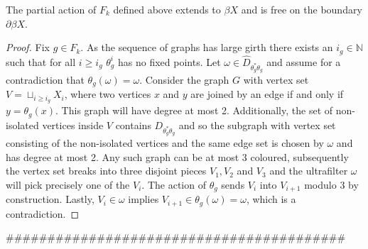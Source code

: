 \begin{lemma}\label{Lem:ParFree}
The partial action of $F_{k}$ defined above extends to $\beta X$ and is free on the boundary $\partial \beta X$.
\end{lemma}
\begin{proof}
Fix $g \in F_{k}$. As the sequence of graphs has large girth there exists an $i_{g} \in \mathbb{N}$ such that for all $i\geq i_{g}$ $\theta_{g}^{i}$ has no fixed points.  Let $\omega \in \widehat{D}_{\theta_{g}^{*}\theta_{g}}$ and assume for a contradiction that $\theta_{g}(\omega)=\omega$. Consider the graph $G$ with vertex set $V=\sqcup_{i\geq i_{g}} X_{i}$, where two vertices $x$ and $y$ are joined by an edge if and only if $y=\theta_{g}(x)$. This graph will have degree at most 2. Additionally, the set of non-isolated vertices inside $V$ contains $D_{\theta_{g}^{*}\theta_{g}}$ and so the subgraph with vertex set consisting of the non-isolated vertices and the same edge set is chosen by $\omega$ and has degree at most 2. Any such graph can be at most $3$ coloured, subsequently the vertex set breaks into three disjoint pieces $V_{1}, V_{2}$ and $V_{3}$ and the ultrafilter $\omega$ will pick precisely one of the $V_{i}$. The action of $\theta_{g}$ sends $V_{i}$ into $V_{i+1}$ modulo $3$ by construction. Lastly, $V_{i} \in \omega$ implies $V_{i+1} \in \theta_{g}(\omega)=\omega$, which is a contradiction.
\end{proof}

#########################################

